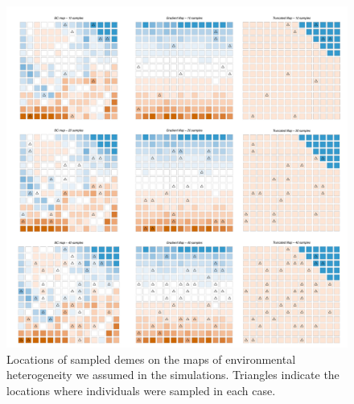 \documentclass[10pt,twoside,lineno]{GSA_format}
\begin{document}
\pagebreak

\begin{figure}[H]
  \includegraphics[width = \textwidth,keepaspectratio]{Plots/sample_maps.pdf}
  \caption{Locations of sampled demes on the maps of environmental heterogeneity we assumed in the simulations. Triangles indicate the locations where individuals were sampled in each case.}

  \label{fig:sampleMaps}
\end{figure}

\pagebreak
\end{document}
